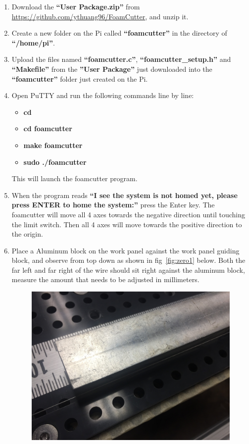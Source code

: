 \documentclass[titlepage,12pt,letter]{report}
\numberwithin{equation}{chapter}
\begin{document}
\begin{enumerate}[noitemsep,topsep=0pt]
\item Download the \textbf{``User Package.zip''} from \href{https://github.com/ythuang96/FoamCutter}{https://github.com/ythuang96/FoamCutter}, and unzip it.
\item Create a new folder on the Pi called \textbf{``foamcutter''} in the directory of \textbf{``/home/pi''}. 
\item Upload the files named \textbf{``foamcutter.c''}, \textbf{``foamcutter\_setup.h''} and \textbf{``Makefile''} from the \textbf{''User Package''} just downloaded into the \textbf{``foamcutter''} folder just created on the Pi.
\item Open PuTTY and run the following commands line by line:
\begin{itemize}[noitemsep,topsep=0pt]
	\item \textbf{cd}
	\item \textbf{cd foamcutter}
	\item \textbf{make foamcutter}
	\item \textbf{sudo ./foamcutter}
\end{itemize}
This will launch the foamcutter program.
\item When the program reads \textbf{``I see the system is not homed yet, please press ENTER to home the system:''} press the Enter key. The foamcutter will move all 4 axes towards the negative direction until touching the limit switch. Then all 4 axes will move towards the positive direction to the origin.
\item Place a Aluminum block on the work panel against the work panel guiding block, and observe from top down as shown in fig~\ref{fig:zero1} below. Both the far left and far right of the wire should sit right against the aluminum block, measure the amount that needs to be adjusted in millimeters. 
\begin{figure} [H]
\includegraphics[width = 0.8\linewidth]{./Figures/zero_wire_1.jpg}

\end{figure}
\end{enumerate}
\end{document}
